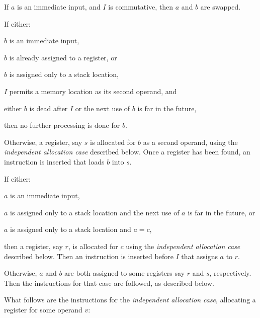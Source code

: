 \begin{legal}
\item If $a$ is an immediate input, and $I$ is commutative, then $a$
  and $b$ are swapped.
\item If either:
  \begin{legal}
  \item $b$ is an immediate input,
  \item $b$ is already assigned to a register, or
    \begin{legal}
    \item $b$ is assigned only to a stack location,
    \item $I$ permits a memory location as its second operand, and
    \item either $b$ is dead after $I$ or the next use of $b$ is far
      in the future,
    \end{legal}
  \end{legal}
  then no further processing is done for $b$.
\item Otherwise, a register, say $s$ is allocated for $b$ as a second
  operand, using the \emph{independent allocation case} described
  below.  Once a register has been found, an instruction is inserted
  that loads $b$ into $s$.
\item If either:
  \begin{legal}
  \item $a$ is an immediate input,
  \item $a$ is assigned only to a stack location and the next use of
    $a$ is far in the future, or
  \item $a$ is assigned only to a stack location and $a = c$,
  \end{legal}
  then a register, say $r$, is allocated for $c$ using the
  \emph{independent allocation case} described below.  Then an
  instruction is inserted before $I$ that assigns $a$ to $r$.
\item Otherwise, $a$ and $b$ are both assigned to some registers say
  $r$ and $s$, respectively.  Then the instructions for that case are
  followed, as described below.
\end{legal}

What follows are the instructions for the \emph{independent allocation
  case}, allocating a register for some operand $v$:

